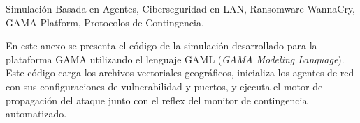 \documentclass{ieeeaccess}
\begin{document}
\begin{keywords}
Simulación Basada en Agentes, Ciberseguridad en LAN, Ransomware WannaCry, GAMA Platform, Protocolos de Contingencia.
\end{keywords}

\maketitle













\newpage
\onecolumn
{}
\label{appendix:gaml_code}
En este anexo se presenta el código de la simulación desarrollado para la plataforma GAMA utilizando el lenguaje GAML (\textit{GAMA Modeling Language}). Este código carga los archivos vectoriales geográficos, inicializa los agentes de red con sus configuraciones de vulnerabilidad y puertos, y ejecuta el motor de propagación del ataque junto con el reflex del monitor de contingencia automatizado.
\end{document}
